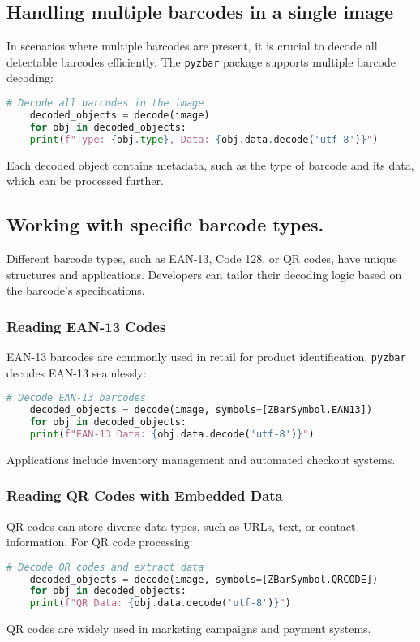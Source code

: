 \subsection{Handling multiple barcodes in a single image}

In scenarios where multiple barcodes are present, it is crucial to decode all detectable barcodes efficiently. The \texttt{pyzbar} package supports multiple barcode decoding:
\begin{lstlisting}[language=Python]
	# Decode all barcodes in the image
	decoded_objects = decode(image)
	for obj in decoded_objects:
	print(f"Type: {obj.type}, Data: {obj.data.decode('utf-8')}")
\end{lstlisting}
Each decoded object contains metadata, such as the type of barcode and its data, which can be processed further.

\subsection{Working with specific barcode types.}

Different barcode types, such as EAN-13, Code 128, or QR codes, have unique structures and applications. Developers can tailor their decoding logic based on the barcode's specifications.

\subsubsection{Reading EAN-13 Codes}
EAN-13 barcodes are commonly used in retail for product identification. \texttt{pyzbar} decodes EAN-13 seamlessly:

\begin{lstlisting}[language=Python]
	# Decode EAN-13 barcodes
	decoded_objects = decode(image, symbols=[ZBarSymbol.EAN13])
	for obj in decoded_objects:
	print(f"EAN-13 Data: {obj.data.decode('utf-8')}")
\end{lstlisting}

Applications include inventory management and automated checkout systems.

\subsubsection{Reading QR Codes with Embedded Data}

QR codes can store diverse data types, such as URLs, text, or contact information. For QR code processing:
\begin{lstlisting}[language=Python]
	# Decode QR codes and extract data
	decoded_objects = decode(image, symbols=[ZBarSymbol.QRCODE])
	for obj in decoded_objects:
	print(f"QR Data: {obj.data.decode('utf-8')}")
\end{lstlisting}
QR codes are widely used in marketing campaigns and payment systems.\cite{Gs1:2024}

